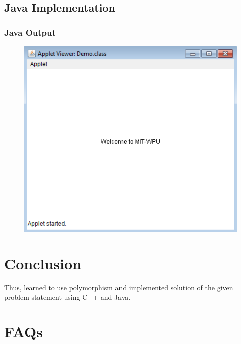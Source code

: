 \documentclass[11pt]{article}
\begin{document}
\subsection{Java Implementation}




\subsubsection{Java Output}
\begin{figure}[H]
	\centering
	\includegraphics[scale=0.4]{../Programs/java_implementations/assignment_9/output_assignment_9.png}
\end{figure}

\section{Conclusion}
Thus, learned to use polymorphism and implemented solution of the given problem statement using C++ and Java.
\pagebreak

\section{FAQs}
\end{document}

